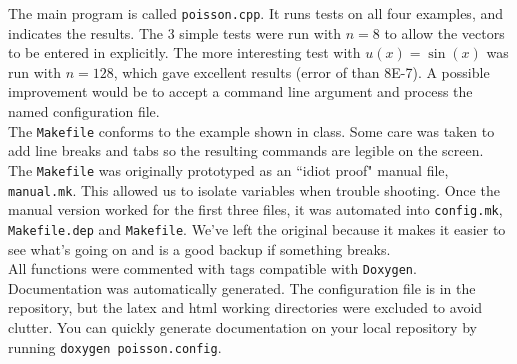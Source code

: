 The main program is called \texttt{poisson.cpp}.  It runs tests on all four examples, and indicates the results.  The 3 simple tests were run with $n=8$ to allow the vectors to be entered in explicitly.  The more interesting test with $u(x) = \sin(x)$ was run with $n=128$, which gave excellent results (error of than 8E-7).  A possible improvement would be to accept a command line argument and process the named configuration file. \\

The \texttt{Makefile} conforms to the example shown in class.  Some care was taken to add line breaks and tabs so the resulting commands are legible on the screen.  The \texttt{Makefile} was originally prototyped as an ``idiot proof" manual file, \texttt{manual.mk}.  This allowed us to isolate variables when trouble shooting.  Once the manual version worked for the first three files, it was automated into \texttt{config.mk}, \texttt{Makefile.dep} and \texttt{Makefile}.  We've left the original because it makes it easier to see what's going on and is a good backup if something breaks. \\

All functions were commented with tags compatible with \texttt{Doxygen}.  Documentation was automatically generated.  The configuration file is in the repository, but the latex and html working directories were excluded to avoid clutter.  You can quickly generate documentation on your local repository by running \texttt{doxygen poisson.config}.